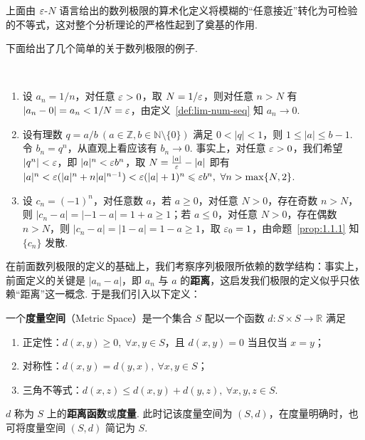 \documentclass[../main.tex]{subfiles}
\begin{document}
上面由 $\varepsilon$-$N$ 语言给出的数列极限的算术化定义将模糊的“任意接近”转化为可检验的不等式，这对整个分析理论的严格性起到了奠基的作用. 

下面给出了几个简单的关于数列极限的例子. 

\begin{example}[数列极限的例子]
    \ 
    \begin{enumerate}[label=(\alph*)]
        \item 设 $a_n = 1/n$，对任意 $\varepsilon > 0$，取 $N = 1 / \varepsilon$，则对任意 $n > N$ 有 $|a_n - 0| = a_n < 1 / N = \varepsilon$，由定义~\ref{def:lim-num-seq} 知 $a_n \to 0$. 

        \item 设有理数 $q = a / b\ (a \in \mathbb Z, b \in \mathbb N \setminus \{0\})$ 满足 $0 < |q| < 1$，则 $1 \leqslant |a| \leqslant b - 1$. 令 $b_n = q^n$，从直观上看应该有 $b_n \to 0$. 事实上，对任意 $\varepsilon > 0$，我们希望 $|q^n| < \varepsilon$，即 $|a|^n < \varepsilon b^n$，取 $N = \frac{|a|}{\varepsilon} - |a|$ 即有 $|a|^n < \varepsilon(|a|^n + n|a|^{n - 1}) < \varepsilon (|a| + 1)^n \leqslant \varepsilon b^n,\ \forall n > \max\{N, 2\}$. 

        \item 设 $c_n = (-1)^n$，对任意数 $a$，若 $a \geqslant 0$，对任意 $N > 0$，存在奇数 $n > N$，则 $|c_n - a| = |-1 - a| = 1 + a \geqslant 1$；若 $a \leqslant 0$，对任意 $N > 0$，存在偶数 $n > N$，则 $|c_n - a| = |1 - a| = 1 - a \geqslant 1$，取 $\varepsilon_0 = 1$，由命题~\ref{prop:1.1.1} 知 $\{c_n\}$ 发散. 
    \end{enumerate}
\end{example}

在前面数列极限的定义的基础上，我们考察序列极限所依赖的数学结构：事实上，前面定义的关键是 $|a_n - a|$，即 $a_n$ 与 $a$ 的\textbf{距离}，这启发我们极限的定义似乎只依赖“距离”这一概念. 于是我们引入以下定义：

\begin{definition}[度量空间的定义] \label{def:metric-space}
    一个\textbf{度量空间}（Metric Space）是一个集合 $S$ 配以一个函数 $d:S \times S \to \mathbb{R}$ 满足
    \begin{enumerate}[label=(\alph*)]
        \item 正定性：$d(x, y) \geqslant 0,\ \forall x, y \in S$，且 $d(x, y) = 0$ 当且仅当 $x = y$；
        \item 对称性：$d(x, y) = d(y, x),\ \forall x, y \in S$；
        \item 三角不等式：$d(x, z) \leqslant d(x, y) + d(y, z),\ \forall x, y, z \in S$. 
    \end{enumerate}
    $d$ 称为 $S$ 上的\textbf{距离函数}或\textbf{度量}. 此时记该度量空间为 $(S, d)$，在度量明确时，也可将度量空间 $(S, d)$ 简记为 $S$. 
\end{definition}
\end{document}
